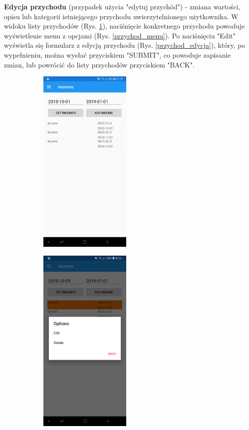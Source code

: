 \textbf{Edycja przychodu} (przypadek użycia "edytuj przychód") - zmiana wartości, opisu lub kategorii istniejącego przychodu uwierzytelnionego użytkownika. W widoku listy przychodów (Rys. \ref{przychody_lista}), naciśnięcie konkretnego przychodu powoduje wyświetlenie menu z opcjami (Rys. \ref{przychod_menu}). Po naciśnięciu "Edit" wyświetla się formularz z edycją przychodu (Rys. \ref{przychod_edycja}), który, po wypełnieniu, można wysłać przyciskiem "SUBMIT", co powoduje zapisanie zmian, lub powrócić do listy przychodów przyciskiem "BACK".
\begin{figure}[!ht]
	\begin{center}
		\begin{subfigure}[b]{0.3\textwidth}
			\includegraphics[width=1.75in]{img/mobile/przychody_gotowe.jpg}
			\label{przychody_lista}
		\end{subfigure}
		\begin{subfigure}[b]{0.3\textwidth}
			\includegraphics[width=1.75in]{img/mobile/przychod_menu.jpg}

\end{subfigure}
\end{center}
\end{figure}
